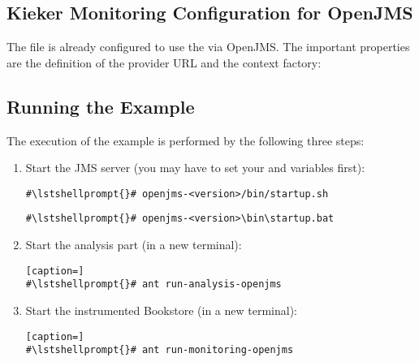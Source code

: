 \subsection{Kieker Monitoring Configuration for OpenJMS}

The file  %
is already configured to use the  via OpenJMS. The important properties are %
the definition of the provider URL and the context factory:

\setPropertiesListing


\setPropertiesListing


\subsection{Running the Example}

 The execution of the example is performed by the following three steps:
\begin{enumerate}
\item Start the JMS server (you may have to set your  and  variables first):

\setBashListing
\begin{lstlisting}[caption=Start of the JMS server under UNIX-like systems]
#\lstshellprompt{}# openjms-<version>/bin/startup.sh
\end{lstlisting}
\begin{lstlisting}[caption=Start of the JMS server under Windows]
#\lstshellprompt{}# openjms-<version>\bin\startup.bat
\end{lstlisting}
\item Start the analysis part (in a new terminal):
\setBashListing
\begin{lstlisting}[caption=]
#\lstshellprompt{}# ant run-analysis-openjms
\end{lstlisting}
\item Start the instrumented Bookstore (in a new terminal):
\setBashListing
\begin{lstlisting}[caption=]
#\lstshellprompt{}# ant run-monitoring-openjms
\end{lstlisting}
\end{enumerate}
